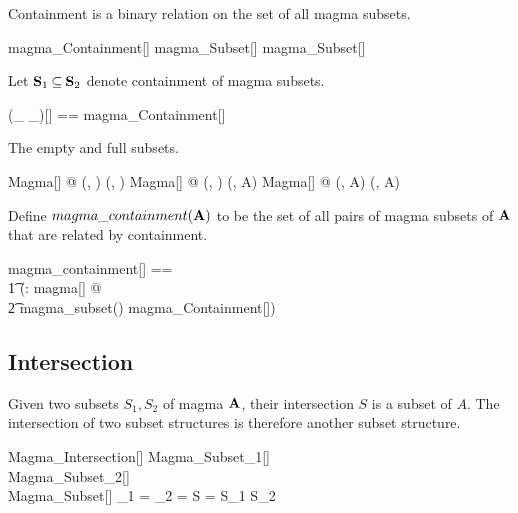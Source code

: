 \documentclass{amsart}
\begin{document}
\begin{remark}
Containment is a binary relation on the set of all magma subsets.

\begin{zed}
	magma\_Containment[\setT] \in magma\_Subset[\setT] \rel magma\_Subset[\setT]
\end{zed}

\end{remark}

Let $\mathbf{S}_1 \mathbin{\subseteq} \mathbf{S}_2$ denote containment of magma subsets.

\begin{zed}
	(\_ \subseteqMagma \_)[\genT] == magma\_Containment[\genT]
\end{zed}

\begin{example}
The empty and full subsets.
\begin{zed}
	\forall Magma[\setT] @ (\strucA, \emptyset) \subseteqMagma (\strucA, \emptyset)
\also
	\forall Magma[\setT] @ (\strucA, \emptyset) \subseteqMagma (\strucA, A)
\also
	\forall Magma[\setT] @ (\strucA, A) \subseteqMagma (\strucA, A)	
\end{zed}

\end{example}

Define $magma\_containment(\mathbf{A})$ to be the set of all pairs of magma subsets of $\mathbf{A}$
that are related by containment.

\begin{zed}
	magma\_containment[\genT] == \\
	\t1	(\lambda \strucA: magma[\genT] @ \\
	\t2		magma\_subset(\strucA) \dres magma\_Containment[\genT])
\end{zed}

\subsection{Intersection}

Given two subsets $S_1, S_2$ of magma $\mathbf{A}$, their intersection $S$ is a subset
of $A$. The intersection of two subset structures is therefore another subset structure.

\begin{schema}{Magma\_Intersection}[\genT]
	Magma\_Subset_1[\genT] \\
	Magma\_Subset_2[\genT] \\
	Magma\_Subset[\genT]
\where
	\strucA_1 = \strucA_2 = \strucA
\also
	S = S_1 \cap S_2
\end{schema}
\end{document}
